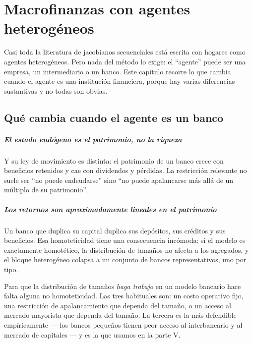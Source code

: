 \chapter{Macrofinanzas con agentes heterogéneos}
\label{cap:macrofinanzas}

Casi toda la literatura de jacobianos secuenciales está escrita con hogares como
agentes heterogéneos. Pero nada del método lo exige: el ``agente'' puede ser una
empresa, un intermediario o un banco. Este capítulo recorre lo que cambia
cuando el agente es una institución financiera, porque hay varias diferencias
sustantivas y no todas son obvias.

\section{Qué cambia cuando el agente es un banco}

\paragraph{El estado endógeno es el patrimonio, no la riqueza} Y su ley de
movimiento es distinta: el patrimonio de un banco crece con beneficios retenidos
y cae con dividendos y pérdidas. La restricción relevante no suele ser ``no
puede endeudarse'' sino ``no puede apalancarse más allá de un múltiplo de su
patrimonio''.

\paragraph{Los retornos son aproximadamente lineales en el patrimonio} Un banco
que duplica su capital duplica sus depósitos, sus créditos y sus beneficios. Esa
homoteticidad tiene una consecuencia incómoda: si el modelo es exactamente
homotético, la distribución de tamaños no afecta a los agregados, y el bloque
heterogéneo colapsa a un conjunto de bancos representativos, uno por tipo.

\begin{idea}
Para que la distribución de tamaños \emph{haga trabajo} en un modelo bancario
hace falta alguna no homoteticidad. Las tres habituales son: un costo operativo
fijo, una restricción de apalancamiento que dependa del tamaño, o un acceso al
mercado mayorista que dependa del tamaño. La tercera es la más defendible
empíricamente --- los bancos pequeños tienen peor acceso al interbancario y al
mercado de capitales --- y es la que usamos en la parte V.
\end{idea}

